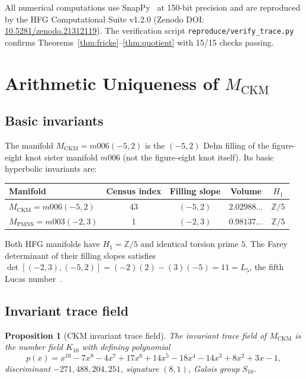 \documentclass[11pt,a4paper]{article}
\newtheorem{proposition}[theorem]{Proposition}
\theoremstyle{remark}
\newcommand{\MCKM}{M_{\mathrm{CKM}}}
\newcommand{\MPMNS}{M_{\mathrm{PMNS}}}
\newcommand{\Zfive}{\mathbb{Z}/5}
\newcommand{\Kten}{K_{10}}
\begin{document}
All numerical computations use SnapPy~\cite{SnapPy} at 150-bit precision
and are reproduced by the HFG Computational Suite v1.2.0
(Zenodo DOI: \href{https://doi.org/10.5281/zenodo.21312119}{10.5281/zenodo.21312119}).
The verification script \texttt{reproduce/verify\_trace.py} confirms
Theorems~\ref{thm:fricke}--\ref{thm:quotient} with 15/15 checks
passing.

\section{Arithmetic Uniqueness of $\MCKM$}
\label{sec:manifold}

\subsection{Basic invariants}

The manifold $\MCKM = m006(-5,2)$ is the $(-5,2)$ Dehn filling of
the figure-eight knot sister manifold $m006$ (not the figure-eight
knot itself).
Its basic hyperbolic invariants are:

\begin{center}
\begin{tabular}{lcccc}
\toprule
Manifold & Census index & Filling slope & Volume & $H_1$ \\
\midrule
$\MCKM = m006(-5,2)$ & 43 & $(-5,2)$ & $2.02988\ldots$ & $\Zfive$ \\
$\MPMNS = m003(-2,3)$ & 1  & $(-2,3)$ & $0.98137\ldots$ & $\Zfive$ \\
\bottomrule
\end{tabular}
\end{center}

Both HFG manifolds have $H_1 = \Zfive$ and identical torsion prime $5$.
The Farey determinant of their filling slopes satisfies
$\det[(-2,3),(-5,2)] = (-2)(2) - (3)(-5) = 11 = L_5$,
the fifth Lucas number~\cite{Gentry:Farey}.

\subsection{Invariant trace field}

\begin{proposition}[CKM invariant trace field]
\label{prop:itf}
The invariant trace field of $\MCKM$ is the number field $\Kten$ with
defining polynomial
\begin{equation}
p(x) = x^{10} - 7x^8 - 4x^7 + 17x^6 + 14x^5
       - 18x^4 - 14x^3 + 8x^2 + 3x - 1,
\label{eq:itf}
\end{equation}
discriminant $-271{,}488{,}204{,}251$, signature $(8,1)$, Galois group $S_{10}$.
\end{proposition}
\end{document}
